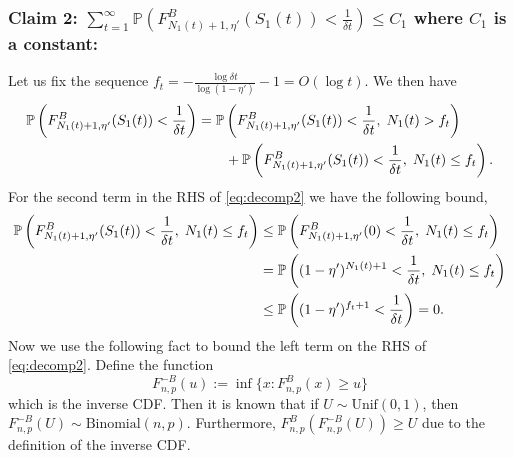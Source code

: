 \begin{myproof}[Proof.]
	\subsubsection*{Claim 2: $ \sum_{t=1}^\infty \mathbb{P}\left(F^B_{N_1(t)+1, \eta'}(S_1(t)) < \frac{1}{\delta t}\right) \le C_1$ where $C_1$ is a constant:}
	Let us fix the sequence $f_t = -\frac{\log \delta t }{\log (1-\eta')}-1 = O(\log t)$. We then have
	\begin{align}
	\P{F^B_{N_1(t)+1, \eta'}(S_1(t)) < \frac{1}{\delta t}} & = \P{F^B_{N_1(t)+1, \eta'}(S_1(t)) < \frac{1}{\delta t}, \; N_1(t) > f_t}  \nonumber \\
	& \qquad + \P{F^B_{N_1(t)+1, \eta'}(S_1(t)) < \frac{1}{\delta t}, \; N_1(t) \le f_t} \label{eq:decomp2}.
	\end{align}
	For the second term in the RHS of \eqref{eq:decomp2} we have the following bound,
	\begin{align}
	\P{F^B_{N_1(t)+1, \eta'}(S_1(t)) < \frac{1}{\delta t}, \; N_1(t) \le f_t}  &  \le \P{F^B_{N_1(t)+1,\eta'}(0) < \frac{1}{\delta  t}, \; N_1(t) \le f_t} \nonumber \\
	& = \P{(1-\eta')^{N_1(t)+1} <  \frac{1}{\delta  t}, \; N_1(t) \le f_t} \nonumber \\
	& \le \P{(1-\eta')^{f_t+1} <  \frac{1}{\delta  t}} = 0.\label{bound:bdd_by_zero}
	\end{align}
	Now we use the following fact to bound the left term on the RHS of \eqref{eq:decomp2}. Define the function
	\[
	F^{-B}_{n,p}(u) := \inf\{x : F^B_{n,p}(x) \ge u\}
	\]
	which is the inverse CDF. Then it is known that if $U \sim \text{Unif}(0,1)$, then $F^{-B}_{n,p}(U) \sim \text{Binomial}(n,p)$. Furthermore, $F^B_{n,p}(F^{-B}_{n,p}(U)) \ge U$ due to the definition of the inverse CDF.
	

\end{myproof}
